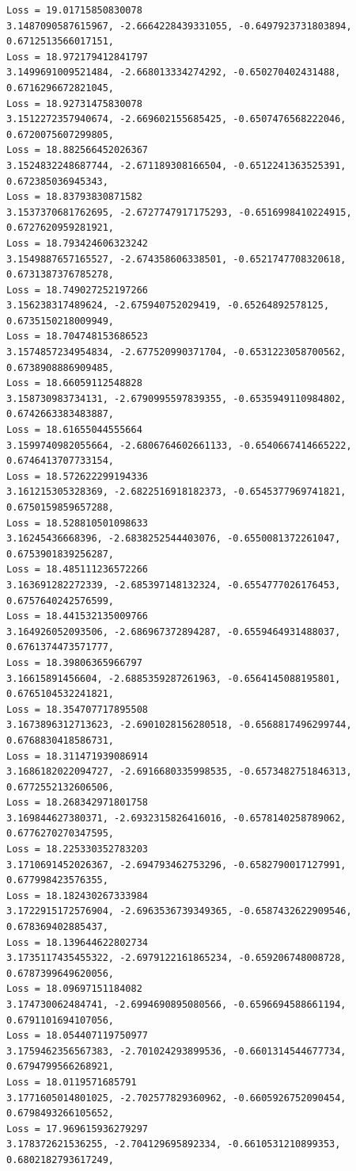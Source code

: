 \documentclass[11pt]{article}
\begin{document}
\begin{Verbatim}[commandchars=\\\{\}]
Loss = 19.01715850830078
3.1487090587615967, -2.6664228439331055, -0.6497923731803894,
0.6712513566017151,
Loss = 18.972179412841797
3.1499691009521484, -2.668013334274292, -0.650270402431488, 0.6716296672821045,
Loss = 18.92731475830078
3.1512272357940674, -2.669602155685425, -0.6507476568222046, 0.6720075607299805,
Loss = 18.882566452026367
3.1524832248687744, -2.671189308166504, -0.6512241363525391, 0.672385036945343,
Loss = 18.83793830871582
3.1537370681762695, -2.6727747917175293, -0.6516998410224915,
0.6727620959281921,
Loss = 18.793424606323242
3.1549887657165527, -2.674358606338501, -0.6521747708320618, 0.6731387376785278,
Loss = 18.749027252197266
3.156238317489624, -2.675940752029419, -0.65264892578125, 0.6735150218009949,
Loss = 18.704748153686523
3.1574857234954834, -2.677520990371704, -0.6531223058700562, 0.6738908886909485,
Loss = 18.66059112548828
3.158730983734131, -2.6790995597839355, -0.6535949110984802, 0.6742663383483887,
Loss = 18.61655044555664
3.1599740982055664, -2.6806764602661133, -0.6540667414665222,
0.6746413707733154,
Loss = 18.572622299194336
3.161215305328369, -2.6822516918182373, -0.6545377969741821, 0.6750159859657288,
Loss = 18.528810501098633
3.16245436668396, -2.6838252544403076, -0.6550081372261047, 0.6753901839256287,
Loss = 18.485111236572266
3.163691282272339, -2.685397148132324, -0.6554777026176453, 0.6757640242576599,
Loss = 18.441532135009766
3.164926052093506, -2.686967372894287, -0.6559464931488037, 0.6761374473571777,
Loss = 18.39806365966797
3.16615891456604, -2.6885359287261963, -0.6564145088195801, 0.6765104532241821,
Loss = 18.354707717895508
3.1673896312713623, -2.6901028156280518, -0.6568817496299744,
0.6768830418586731,
Loss = 18.311471939086914
3.1686182022094727, -2.6916680335998535, -0.6573482751846313,
0.6772552132606506,
Loss = 18.268342971801758
3.169844627380371, -2.6932315826416016, -0.6578140258789062, 0.6776270270347595,
Loss = 18.225330352783203
3.1710691452026367, -2.694793462753296, -0.6582790017127991, 0.677998423576355,
Loss = 18.182430267333984
3.1722915172576904, -2.6963536739349365, -0.6587432622909546, 0.678369402885437,
Loss = 18.139644622802734
3.1735117435455322, -2.6979122161865234, -0.659206748008728, 0.6787399649620056,
Loss = 18.09697151184082
3.174730062484741, -2.6994690895080566, -0.6596694588661194, 0.6791101694107056,
Loss = 18.054407119750977
3.1759462356567383, -2.701024293899536, -0.6601314544677734, 0.6794799566268921,
Loss = 18.0119571685791
3.1771605014801025, -2.702577829360962, -0.6605926752090454, 0.6798493266105652,
Loss = 17.969615936279297
3.178372621536255, -2.704129695892334, -0.6610531210899353, 0.6802182793617249,

\end{Verbatim}
\end{document}
